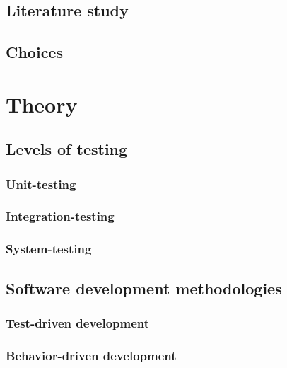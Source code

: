 \documentclass[a4paper]{report}
\begin{document}
  \section{Literature study}
  

  \section{Choices}
  


\chapter{Theory}
\label{chap:theory}

  \section{Levels of testing}
    

    \subsection{Unit-testing}
    \label{sec:unit_testing}
    

    \subsection{Integration-testing}
    \label{sec:integration_testing}
    

    \subsection{System-testing}
    


  \section{Software development methodologies}
    

    \subsection{Test-driven development}
    \label{sec:tdd}
    

    \subsection{Behavior-driven development}
    
\end{document}
